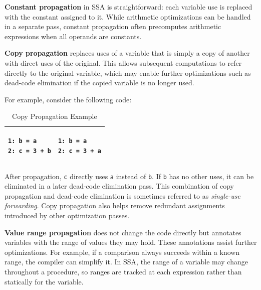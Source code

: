 \textbf{Constant propagation} in \ac{SSA} is straightforward: each variable use is replaced with the constant assigned to it. While arithmetic optimizations can be handled in a separate pass, constant propagation often precomputes arithmetic expressions when all operands are constants\cite{dragon-book}.

\textbf{Copy propagation} replaces uses of a variable that is simply a copy of another with direct uses of the original. This allows subsequent computations to refer directly to the original variable, which may enable further optimizations such as dead-code elimination if the copied variable is no longer used.

For example, consider the following code:

\begin{table}[h]
	\centering
    \caption{Copy Propagation Example}
	\renewcommand{\arraystretch}{1.2}
	\begin{tabular}{ |p{7cm}|p{7cm}| }
		\hline
        \begin{minipage}[t]{7cm}
        \begin{lstlisting}
1: b = a
2: c = 3 + b
        \end{lstlisting}
        \end{minipage}
        &
        \begin{minipage}[t]{7cm}
        \begin{lstlisting}
1: b = a
2: c = 3 + a
        \end{lstlisting}
        \end{minipage}
	\\
        \hline
	\end{tabular}
\end{table}

After propagation, \texttt{c} directly uses \texttt{a} instead of \texttt{b}. If \texttt{b} has no other uses, it can be eliminated in a later dead-code elimination pass. This combination of copy propagation and dead-code elimination is sometimes referred to as \emph{single-use forwarding}. Copy propagation also helps remove redundant assignments introduced by other optimization passes.

\textbf{Value range propagation} does not change the code directly but annotates variables with the range of values they may hold. These annotations assist further optimizations. For example, if a comparison always succeeds within a known range, the compiler can simplify it. In \ac{SSA}, the range of a variable may change throughout a procedure, so ranges are tracked at each expression rather than statically for the variable.

